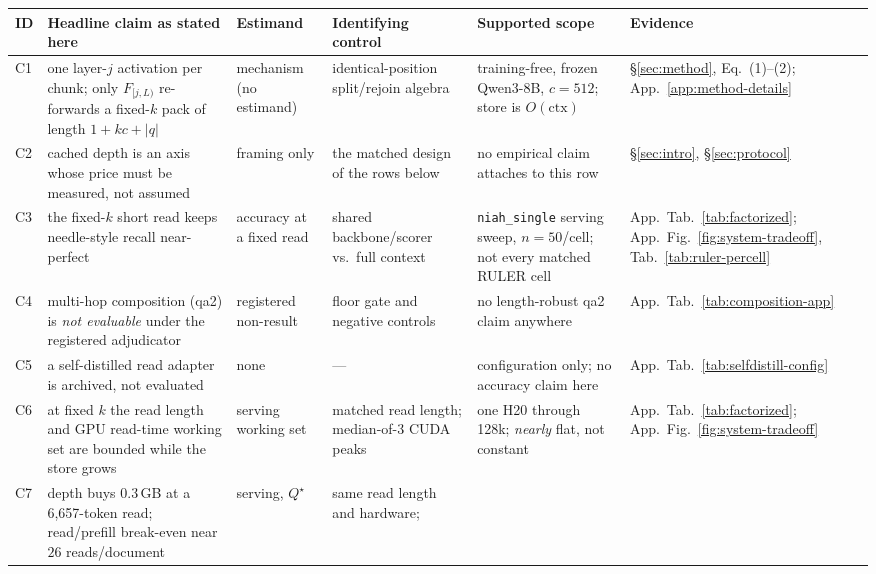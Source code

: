 \begin{table}[t]
\centering
\scriptsize
\setlength{\tabcolsep}{3pt}
\renewcommand{\arraystretch}{1.06}
\begin{tabular}{@{}>{\raggedright\arraybackslash}p{}
>{\raggedright\arraybackslash}p{}
>{\raggedright\arraybackslash}p{}
>{\raggedright\arraybackslash}p{}
>{\raggedright\arraybackslash}p{}
>{\raggedright\arraybackslash}p{}@{}}
\toprule
\textbf{ID} & \textbf{Headline claim as stated here} & \textbf{Estimand} &
\textbf{Identifying control} & \textbf{Supported scope} &
\textbf{Evidence} \\
\midrule
C1 & one layer-$j$ activation per chunk; only $F_{[j,L)}$ re-forwards a
fixed-$k$ pack of length $1{+}kc{+}|q|$ & mechanism (no estimand) &
identical-position split/rejoin algebra & training-free, frozen Qwen3-8B,
$c{=}512$; store is $O(\text{ctx})$ & \S\ref{sec:method}, Eq.~(1)--(2);
App.~\ref{app:method-details} \\
C2 & cached depth is an axis whose price must be measured, not assumed &
framing only & the matched design of the rows below & no empirical claim
attaches to this row & \S\ref{sec:intro}, \S\ref{sec:protocol} \\
C3 & the fixed-$k$ short read keeps needle-style recall near-perfect &
accuracy at a fixed read & shared backbone/scorer vs.\ full context &
\texttt{niah\_single} serving sweep, $n{=}50$/cell; not every matched RULER cell
& App.~Tab.~\ref{tab:factorized}; App.~Fig.~\ref{fig:system-tradeoff},
Tab.~\ref{tab:ruler-percell} \\
C4 & multi-hop composition (qa2) is \emph{not evaluable} under the registered
adjudicator & registered non-result & floor gate and negative controls &
no length-robust qa2 claim anywhere & App.~Tab.~\ref{tab:composition-app} \\
C5 & a self-distilled read adapter is archived, not evaluated &
none & --- & configuration only; no accuracy claim here &
App.~Tab.~\ref{tab:selfdistill-config} \\
C6 & at fixed $k$ the read length and GPU read-time working set are bounded
while the store grows & serving working set & matched read length;
median-of-3 CUDA peaks & one H20 through 128k; \emph{nearly} flat, not constant
& App.~Tab.~\ref{tab:factorized}; App.~Fig.~\ref{fig:system-tradeoff} \\
C7 & depth buys $0.3$\,GB at a 6{,}657-token read; read/prefill break-even
near $26$ reads/document & serving, $Q^\star$ & same read length and hardware;

\end{tabular}
\end{table}
